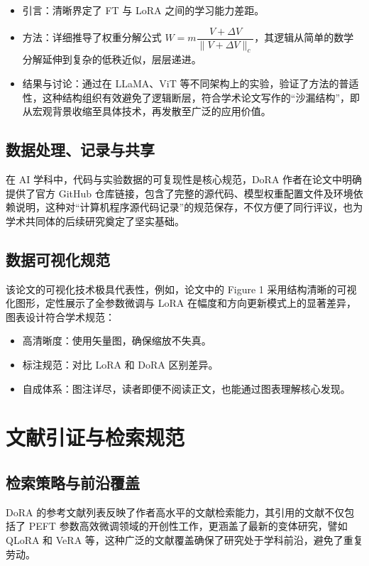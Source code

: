 \documentclass[12pt, hyperref, a4paper, UTF8]{ctexart}
\begin{document}
\begin{itemize}
    \item 引言：清晰界定了 FT 与 LoRA 之间的学习能力差距。
    \item 方法：详细推导了权重分解公式 $W=m\dfrac{V+\Delta V}{\|V+\Delta V\|_c}$，其逻辑从简单的数学分解延伸到复杂的低秩近似，层层递进。
    \item 结果与讨论：通过在 LLaMA、ViT 等不同架构上的实验，验证了方法的普适性，这种结构组织有效避免了逻辑断层，符合学术论文写作的“沙漏结构”，即从宏观背景收缩至具体技术，再发散至广泛的应用价值。
\end{itemize}



\subsection{数据处理、记录与共享}
在 AI 学科中，代码与实验数据的可复现性是核心规范，DoRA 作者在论文中明确提供了官方 GitHub 仓库链接，包含了完整的源代码、模型权重配置文件及环境依赖说明，这种对“计算机程序源代码记录”的规范保存，不仅方便了同行评议，也为学术共同体的后续研究奠定了坚实基础。



\subsection{数据可视化规范}
该论文的可视化技术极具代表性，例如，论文中的 Figure 1 采用结构清晰的可视化图形，定性展示了全参数微调与 LoRA 在幅度和方向更新模式上的显著差异，图表设计符合学术规范：

\begin{itemize}
    \item 高清晰度：使用矢量图，确保缩放不失真。
    \item 标注规范：对比 LoRA 和 DoRA 区别差异。
    \item 自成体系：图注详尽，读者即便不阅读正文，也能通过图表理解核心发现。
\end{itemize}



\section{文献引证与检索规范}
\subsection{检索策略与前沿覆盖}
DoRA 的参考文献列表反映了作者高水平的文献检索能力，其引用的文献不仅包括了 PEFT 参数高效微调领域的开创性工作，更涵盖了最新的变体研究，譬如 QLoRA 和 VeRA 等，这种广泛的文献覆盖确保了研究处于学科前沿，避免了重复劳动。
\end{document}
